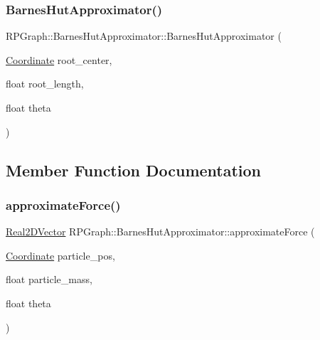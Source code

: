 \subsubsection{\texorpdfstring{Barnes\+Hut\+Approximator()}{BarnesHutApproximator()}}
{\footnotesize\ttfamily R\+P\+Graph\+::\+Barnes\+Hut\+Approximator\+::\+Barnes\+Hut\+Approximator (\begin{DoxyParamCaption}\item[{\mbox{\hyperlink{classRPGraph_1_1Coordinate}{Coordinate}}}]{root\+\_\+center,  }\item[{float}]{root\+\_\+length,  }\item[{float}]{theta }\end{DoxyParamCaption})}



\subsection{Member Function Documentation}
\mbox{\label{classRPGraph_1_1BarnesHutApproximator_a28582390211be5a653420a6ff6e2c392}} 
\subsubsection{\texorpdfstring{approximate\+Force()}{approximateForce()}}
{\footnotesize\ttfamily \mbox{\hyperlink{classRPGraph_1_1Real2DVector}{Real2\+D\+Vector}} R\+P\+Graph\+::\+Barnes\+Hut\+Approximator\+::approximate\+Force (\begin{DoxyParamCaption}\item[{\mbox{\hyperlink{classRPGraph_1_1Coordinate}{Coordinate}}}]{particle\+\_\+pos,  }\item[{float}]{particle\+\_\+mass,  }\item[{float}]{theta }\end{DoxyParamCaption})}

\mbox{\label{classRPGraph_1_1BarnesHutApproximator_a11275640594b1e706c2ca9cd58cf4b67}} 
